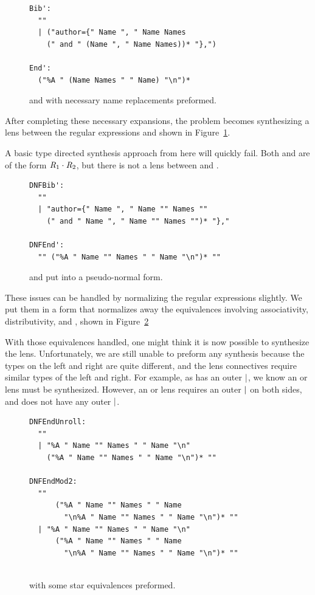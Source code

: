 \documentclass[numbers]{sigplanconf}
\begin{document}
\begin{figure}
\begin{lstlisting}
Bib':
  "" 
  | ("author={" Name ", " Name Names
    (" and " (Name ", " Name Names))* "},")

End':
  ("%A " (Name Names " " Name) "\n")*
\end{lstlisting}
\label{fig:examples-expanded}
\caption{
   and  with necessary name replacements preformed.
}
\end{figure}
After completing these necessary expansions, the problem becomes synthesizing a
lens between the regular expressions  and  shown in
Figure~\ref{fig:examples-expanded}.

A basic type directed synthesis approach from here will quickly fail.
Both 
and  are of the form $\mathit{R}_1\cdot\mathit{R}_2$, but there is
not a lens between  and
.

\begin{figure}
\begin{lstlisting}
DNFBib':
  ""
  | "author={" Name ", " Name "" Names ""
    (" and " Name ", " Name "" Names "")* "},"

DNFEnd':
  "" ("%A " Name "" Names " " Name "\n")* ""
\end{lstlisting}
\label{fig:examples-expanded-normalized}
\caption{
   and  put into a pseudo-normal form.
}
\end{figure}

These issues can be handled by normalizing the regular expressions slightly.
We put them in a form that normalizes away the equivalences involving
associativity, distributivity, and \EmptyString{}, shown in
Figure~\ref{fig:examples-expanded-normalized}


With those equivalences handled, one might think it is now possible to
synthesize the lens.
Unfortunately, we are still unable to preform any synthesis because the types
on the left and right are quite different, and the lens connectives require
similar types of the left and right.
For example, as  has an outer $|$, we know an or lens must be
synthesized.
However, an or lens requires an outer $|$ on both sides, and  does
not have any outer $|$.

\begin{figure}
\begin{lstlisting}
DNFEndUnroll:
  ""
  | "%A " Name "" Names " " Name "\n"
    ("%A " Name "" Names " " Name "\n")* ""

DNFEndMod2:
  ""
      ("%A " Name "" Names " " Name
        "\n%A " Name "" Names " " Name "\n")* ""
  | "%A " Name "" Names " " Name "\n"
      ("%A " Name "" Names " " Name
        "\n%A " Name "" Names " " Name "\n")* ""
  
\end{lstlisting}
\label{fig:examples-star-equivalenced}
\caption{
   with some star equivalences preformed.
}
\end{figure}
\end{document}
